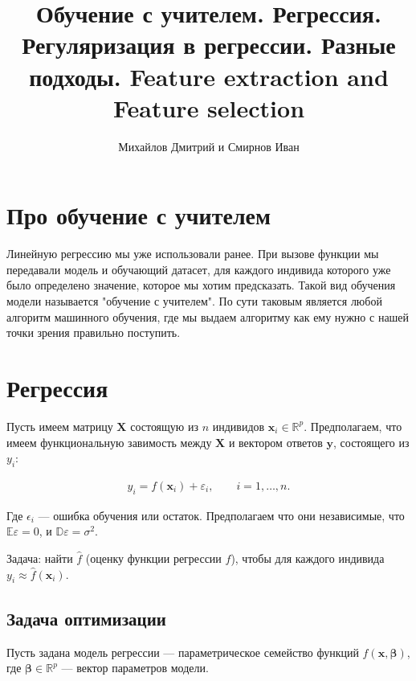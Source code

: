 \documentclass[12pt]{article}
\newcommand{\betaa}{\bm{\beta}}
\begin{document}
	\title{Обучение с учителем. Регрессия. Регуляризация в регрессии. Разные подходы. Feature extraction and Feature selection}
	\author{Михайлов Дмитрий и Смирнов Иван}
	\maketitle
	
	\newpage
	\tableofcontents
	\newpage
	
	\section{Про обучение с учителем}
	
	Линейную регрессию мы уже использовали ранее. При вызове функции мы передавали модель и обучающий датасет, для каждого индивида которого уже было определено значение, которое мы хотим предсказать.
	Такой вид обучения модели называется "обучение с учителем". По сути таковым является любой алгоритм машинного обучения, где мы выдаем алгоритму как ему нужно с нашей точки зрения правильно поступить.
	
	\section{Регрессия}
	
	Пусть имеем матрицу $\mathbf{X}$ состоящую из $n$ индивидов $\mathbf{x}_i \in \mathbb{R}^p$. Предполагаем, что имеем функциональную завимость между  $\mathbf{X}$ и вектором ответов $\mathbf{y}$, состоящего из $y_i$:
	
	\begin{eqnarray}\label{regBase}  
		y_i = f(\mathbf{x}_i) + \varepsilon_i,
		\qquad 
		i=1,\ldots,n.
	\end{eqnarray}


	Где $\epsilon_i$ --- ошибка обучения или остаток. Предполагаем что они независимые, что $\mathbb{E} \varepsilon = 0$, и $\mathbb{D} \varepsilon = \sigma^2$.
	
	Задача: найти $\hat{f}$ (оценку функции регрессии $f$), чтобы для каждого индивида 	$y_i \approx \hat{f}(\mathbf{x}_i)$.
	
	\subsection{Задача оптимизации}
	
	Пусть задана модель регрессии --- параметрическое семейство функций $f(\mathbf x, \betaa)$, где $\betaa \in \mathbb{R}^p$ --- вектор параметров модели.
	
\end{document}
